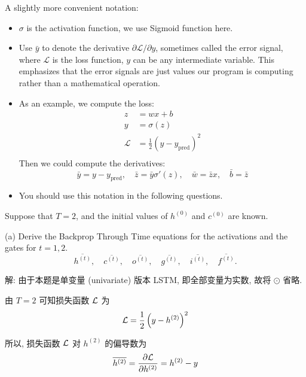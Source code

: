 \documentclass{article}
\begin{document}
A slightly more convenient notation:
\begin{itemize}
  \item $\sigma$ is the activation function, we use Sigmoid function here. 
  \item Use $\bar{y}$ to denote the derivative $\partial\mathcal{L}/\partial y$, sometimes called the error signal, where $\mathcal{L}$ is the loss function, $y$ can be any intermediate variable. This emphasizes that the error signals are just values our program is computing rather than a mathematical operation.
  \item As an example, we compute the loss:
  \begin{equation}
    \begin{aligned}
      z &= wx + b\\
      y &= \sigma(z)\\
      \mathcal{L} &= \frac{1}{2}(y-y_\mathrm{pred})^2 \\
    \end{aligned}
  \end{equation}
  Then we could compute the derivatives:
  \begin{equation}
    \bar{y} = y - y_\mathrm{pred},\quad
    \bar{z} = \bar{y}\sigma'(z),\quad
    \bar{w} = \bar{z}x,\quad
    \bar{b} = \bar{z}
  \end{equation}
  \item You should use this notation in the following questions.
\end{itemize}

Suppose that $T = 2$, and the initial values of $h^{(0)}$ and $c^{(0)}$ are known.

(a) Derive the Backprop Through Time equations for the activations and the gates for $t=1, 2$.
\begin{equation}
  \overline{h^{(t)}},\quad
  \overline{c^{(t)}},\quad
  \overline{o^{(t)}},\quad
  \overline{g^{(t)}},\quad
  \overline{i^{(t)}},\quad
  \overline{f^{(t)}}.
\end{equation}

解: 由于本题是单变量 (univariate) 版本 LSTM, 即全部变量为实数, 故将 $\odot$ 省略. 

由 $T=2$ 可知损失函数 $\mathcal{L}$ 为
\begin{equation}
  \mathcal{L}=\frac{1}{2}\left(y-h^{(2)}\right)^2
\end{equation}

所以, 损失函数 $\mathcal{L}$ 对 $h^{(2)}$ 的偏导数为
\begin{equation}
  \overline{h^{(2)}}
  =\frac{\partial\mathcal{L}}{\partial h^{(2)}}
  =h^{(2)}-y
\end{equation}
\end{document}
